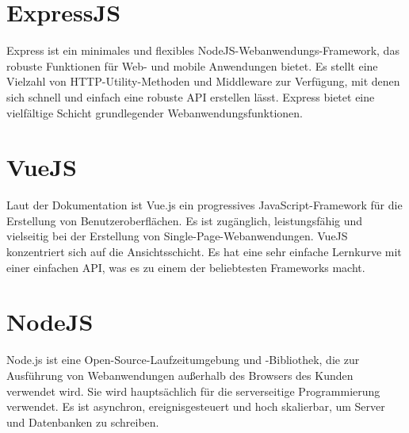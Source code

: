 \section{ExpressJS}
Express ist ein minimales und flexibles NodeJS-Webanwendungs-Framework, das robuste Funktionen für Web- und mobile Anwendungen bietet. Es stellt eine Vielzahl von HTTP-Utility-Methoden und Middleware zur Verfügung, mit denen sich schnell und einfach eine robuste API erstellen lässt. Express bietet eine vielfältige Schicht grundlegender Webanwendungsfunktionen.

\section{VueJS}
Laut der Dokumentation ist Vue.js ein progressives JavaScript-Framework für die Erstellung von Benutzeroberflächen. Es ist zugänglich, leistungsfähig und vielseitig bei der Erstellung von Single-Page-Webanwendungen.
VueJS konzentriert sich auf die Ansichtsschicht. Es hat eine sehr einfache Lernkurve mit einer einfachen API, was es zu einem der beliebtesten Frameworks macht.

\section{NodeJS}
Node.js ist eine Open-Source-Laufzeitumgebung und -Bibliothek, die zur Ausführung von Webanwendungen außerhalb des Browsers des Kunden verwendet wird. Sie wird hauptsächlich für die serverseitige Programmierung verwendet. Es ist asynchron, ereignisgesteuert und hoch skalierbar, um Server und Datenbanken zu schreiben.


